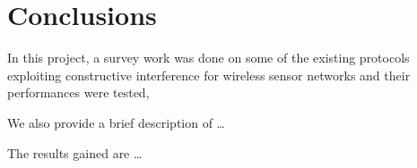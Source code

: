 
\chapter{Conclusions}\label{ch:conclusion}

In this project, a survey work was done on some of the existing protocols exploiting constructive interference for wireless sensor networks and their performances were tested,



We also provide a brief description of \dots


The results gained are \dots

